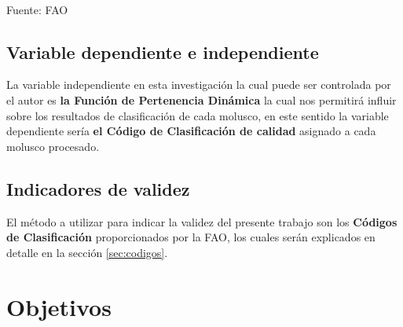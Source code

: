 \begin{table}[H]
\centering \caption{\label{tab:tabCodigoMolusco} Códigos de exportación de moluscos Conchas de Abanico}
\begin{center}
	\\ \scriptsize Fuente: FAO
	\end{center}
\end{table}



\subsection{Variable dependiente e independiente}
La variable independiente en esta investigación la cual puede ser controlada por el autor es \textbf{la Función de Pertenencia Dinámica} la cual nos permitirá influir sobre los resultados de clasificación de cada molusco, en este sentido la variable dependiente sería \textbf{el Código de Clasificación de calidad} asignado a cada molusco procesado. 


\subsection{Indicadores de validez}
El método a utilizar para indicar la validez del presente trabajo son los \textbf{Códigos de Clasificación} proporcionados por la FAO, los cuales serán explicados en detalle en la sección \ref{sec:codigos}.

\section{Objetivos}
\label{sec:objetivo}


